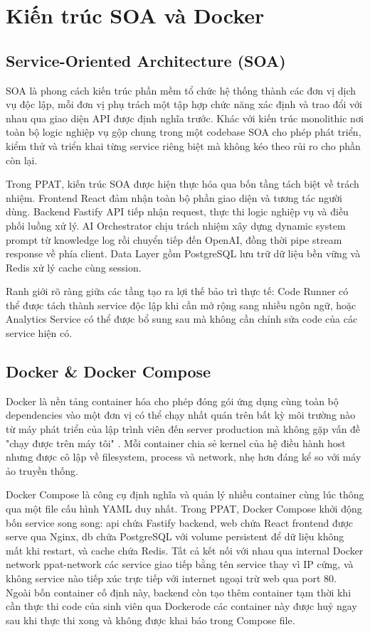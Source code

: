 \documentclass[../main.tex]{subfiles}
\begin{document}
\section{Kiến trúc SOA và Docker}

\subsection{Service-Oriented Architecture (SOA)}

SOA là phong cách kiến trúc phần mềm tổ chức hệ thống thành các đơn vị dịch vụ độc lập, mỗi đơn vị phụ trách một tập hợp chức năng xác định và trao đổi với nhau qua giao diện API được định nghĩa trước. Khác với kiến trúc monolithic nơi toàn bộ logic nghiệp vụ gộp chung trong một codebase SOA cho phép phát triển, kiểm thử và triển khai từng service riêng biệt mà không kéo theo rủi ro cho phần còn lại.

Trong PPAT, kiến trúc SOA được hiện thực hóa qua bốn tầng tách biệt về trách nhiệm. Frontend React đảm nhận toàn bộ phần giao diện và tương tác người dùng. Backend Fastify API tiếp nhận request, thực thi logic nghiệp vụ và điều phối luồng xử lý. AI Orchestrator chịu trách nhiệm xây dựng dynamic system prompt từ knowledge log rồi chuyển tiếp đến OpenAI, đồng thời pipe stream response về phía client. Data Layer gồm PostgreSQL lưu trữ dữ liệu bền vững và Redis xử lý cache cùng session.

Ranh giới rõ ràng giữa các tầng tạo ra lợi thế bảo trì thực tế: Code Runner có thể được tách thành service độc lập khi cần mở rộng sang nhiều ngôn ngữ, hoặc Analytics Service có thể được bổ sung sau mà không cần chỉnh sửa code của các service hiện có.

\subsection{Docker \& Docker Compose}

Docker là nền tảng container hóa cho phép đóng gói ứng dụng cùng toàn bộ dependencies vào một đơn vị có thể chạy nhất quán trên bất kỳ môi trường nào từ máy phát triển của lập trình viên đến server production mà không gặp vấn đề "chạy được trên máy tôi" \cite{docker2024docs}. Mỗi container chia sẻ kernel của hệ điều hành host nhưng được cô lập về filesystem, process và network, nhẹ hơn đáng kể so với máy ảo truyền thống.

Docker Compose là công cụ định nghĩa và quản lý nhiều container cùng lúc thông qua một file cấu hình YAML duy nhất. Trong PPAT, Docker Compose khởi động bốn service song song: api chứa Fastify backend, web chứa React frontend được serve qua Nginx, db chứa PostgreSQL với volume persistent để dữ liệu không mất khi restart, và cache chứa Redis. Tất cả kết nối với nhau qua internal Docker network ppat-network các service giao tiếp bằng tên service thay vì IP cứng, và không service nào tiếp xúc trực tiếp với internet ngoại trừ web qua port 80. Ngoài bốn container cố định này, backend còn tạo thêm container tạm thời khi cần thực thi code của sinh viên qua Dockerode các container này được huỷ ngay sau khi thực thi xong và không được khai báo trong Compose file.
\end{document}
